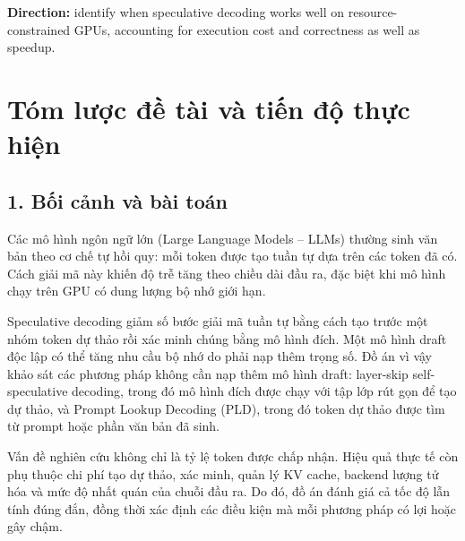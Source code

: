 \noindent\textbf{Direction:} identify when speculative decoding works well on resource-constrained GPUs, accounting for execution cost and correctness as well as speedup.

\clearpage
{}
\chapter*{Tóm lược đề tài và tiến độ thực hiện}

\section*{1. Bối cảnh và bài toán}
Các mô hình ngôn ngữ lớn (Large Language Models -- LLMs) thường sinh văn bản theo cơ chế tự hồi quy: mỗi token được tạo tuần tự dựa trên các token đã có. Cách giải mã này khiến độ trễ tăng theo chiều dài đầu ra, đặc biệt khi mô hình chạy trên GPU có dung lượng bộ nhớ giới hạn.

Speculative decoding giảm số bước giải mã tuần tự bằng cách tạo trước một nhóm token dự thảo rồi xác minh chúng bằng mô hình đích. Một mô hình draft độc lập có thể tăng nhu cầu bộ nhớ do phải nạp thêm trọng số. Đồ án vì vậy khảo sát các phương pháp không cần nạp thêm mô hình draft: layer-skip self-speculative decoding, trong đó mô hình đích được chạy với tập lớp rút gọn để tạo dự thảo, và Prompt Lookup Decoding (PLD), trong đó token dự thảo được tìm từ prompt hoặc phần văn bản đã sinh.

Vấn đề nghiên cứu không chỉ là tỷ lệ token được chấp nhận. Hiệu quả thực tế còn phụ thuộc chi phí tạo dự thảo, xác minh, quản lý KV cache, backend lượng tử hóa và mức độ nhất quán của chuỗi đầu ra. Do đó, đồ án đánh giá cả tốc độ lẫn tính đúng đắn, đồng thời xác định các điều kiện mà mỗi phương pháp có lợi hoặc gây chậm.

